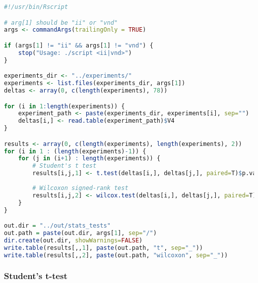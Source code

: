 \begin{lstlisting}[language=R]
#!/usr/bin/Rscript

# arg[1] should be "ii" or "vnd"
args <- commandArgs(trailingOnly = TRUE)

if (args[1] != "ii" && args[1] != "vnd") {
    stop("Usage: ./script <ii|vnd>")
}

experiments_dir <- "../experiments/"
experiments <- list.files(experiments_dir, args[1])
deltas <- array(0, c(length(experiments), 78))

for (i in 1:length(experiments)) {
    experiment_path <- paste(experiments_dir, experiments[i], sep="")
    deltas[i,] <- read.table(experiment_path)$V4
}

results <- array(0, c(length(experiments), length(experiments), 2))
for (i in 1 : (length(experiments)-1)) {
    for (j in (i+1) : length(experiments)) {
        # Student's t test
        results[i,j,1] <- t.test(deltas[i,], deltas[j,], paired=T)$p.value
        
        # Wilcoxon signed-rank test
        results[i,j,2] <- wilcox.test(deltas[i,], deltas[j,], paired=T)$p.value
    }
}

out.dir = "../out/stats_tests"
out.path = paste(out.dir, args[1], sep="/")
dir.create(out.dir, showWarnings=FALSE)
write.table(results[,,1], paste(out.path, "t", sep="_"))
write.table(results[,,2], paste(out.path, "wilcoxon", sep="_"))
\end{lstlisting}

\newpage

\subsubsection{Student's t-test}


